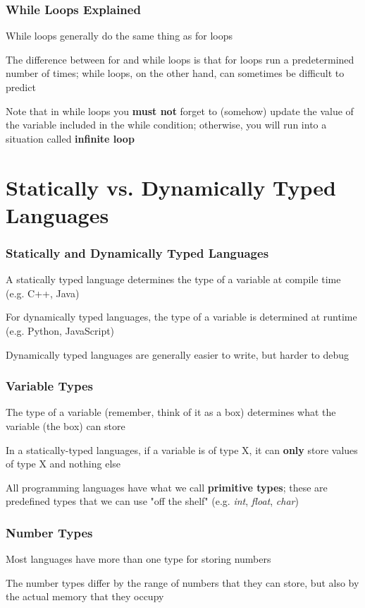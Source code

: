 \documentclass{beamer}
\begin{document}
\begin{frame}
\frametitle{While Loops Explained}
    While loops generally do the same thing as for loops
    \newline

    The difference between for and while loops is that for loops run a predetermined number of times; while loops, on the other hand, can sometimes be difficult to predict
    \newline

    Note that in while loops you \textbf{must not} forget to (somehow) update the value of the variable included in the while condition; otherwise, you will run into a situation called \textbf{infinite loop}
\end{frame}

\section{Statically vs. Dynamically Typed Languages}

\begin{frame}
\frametitle{Statically and Dynamically Typed Languages}
    A statically typed language determines the type of a variable at compile time (e.g. C++, Java)
    \newline

    For dynamically typed languages, the type of a variable is determined at runtime (e.g. Python, JavaScript)
    \newline

    Dynamically typed languages are generally easier to write, but harder to debug
\end{frame}

\begin{frame}
\frametitle{Variable Types}
    The type of a variable (remember, think of it as a box) determines what the variable (the box) can store
    \newline

    In a statically-typed languages, if a variable is of type X, it can \textbf{only} store values of type X and nothing else
    \newline

    All programming languages have what we call \textbf{primitive types}; these are predefined types that we can use "off the shelf" (e.g. \emph{int}, \emph{float}, \emph{char})
\end{frame}

\begin{frame}
\frametitle{Number Types}
    Most languages have more than one type for storing numbers
    \newline

    The number types differ by the range of numbers that they can store, but also by the actual memory that they occupy
\end{frame}
\end{document}
